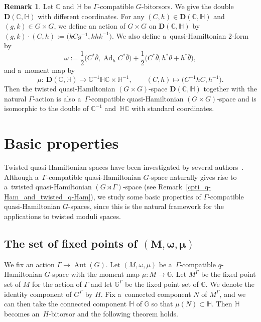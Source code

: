 \documentclass[10pt,a4paper]{amsart}
\numberwithin{equation}{section}
\theoremstyle{definition}
\newtheorem{Remark}[Theorem]{Remark}
\newcommand{\Ad}{\operatorname{Ad}}
\newcommand{\Aut}{\operatorname{Aut}}
\newcommand{\bG}{\mathbb{G}}
\newcommand{\bH}{\mathbb{H}}
\newcommand{\bC}{\mathbb{C}}
\begin{document}
\begin{Remark}\label{the double with different coordinates}
 Let $\bC$ and $\bH$ be $\Gamma$-compatible $G$-bitorsors. We give the double $\textbf{D}(\bC,\bH)$ with different coordinates.
 For any $(C,h) \in \textbf{D}(\bC,\bH)$ and $(g,k) \in G \times G$, we define an action of $G \times G$ on $\textbf{D}(\bC,\bH)$ by $(g,k) \cdot (C,h) := \bigl(kCg^{-1},khk^{-1}\bigr)$.
 We also define a~quasi-Hamiltonian $2$-form by
 \[\omega := \frac{1}{2}\bigl(C^*\overline{\theta},\Ad_{h}C^*\overline{\theta}\bigr)+\frac{1}{2}\bigl(C^*\overline{\theta},h^*\theta+h^*\overline{\theta}\bigr),\]
 and a~moment map by
 \[
 \mu \colon\ \textbf{D}(\bC,\bH) \to \bC^{-1} \bH \bC \times \bH^{-1},\qquad (C,h) \mapsto \bigl(C^{-1}hC, h^{-1}\bigr).
 \]
 Then the twisted quasi-Hamiltonian $(G \times G)$-space $\textbf{D}(\bC,\bH)$ together with the natural $\Gamma$-action is also a~$\Gamma$-compatible quasi-Hamiltonian $(G \times G)$-space and is isomorphic to the double of $\bC^{-1}$ and~$\bH \bC$ with standard coordinates.
\end{Remark}

\section{Basic properties}\label{3Basic_properties}

Twisted quasi-Hamiltonian spaces have been investigated by several authors~\cite{B-Y2015,Knop,Meinrenken2017}.
Although a~$\Gamma$-compatible quasi-Hamiltonian $G$-space naturally gives rise to a~twisted quasi-Hamil\-tonian $(G \rtimes \Gamma)$-space (see Remark~\ref{cpti_q-Ham_and_twisted_q-Ham}), we study some basic properties of $\Gamma$-compatible quasi-Hamiltonian $G$-spaces, since this is the natural framework for the applications to twisted moduli spaces.

\subsection[The set of fixed points of (M, omega, mu)]{The set of fixed points of $\boldsymbol{(M, \omega, \mu)}$}

We fix an action $\Gamma \to \Aut(G)$.
Let $(M,\omega, \mu)$ be a~$\Gamma$-compatible $q$-Hamiltonian $G$-space with the moment map $\mu \colon M \to \bG$.
Let $M^{\Gamma}$ be the fixed point set of $M$ for the action of $\Gamma$ and let $\bG^{\Gamma}$ be the fixed point set of $\bG$.
We denote the identity component of $G^{\Gamma}$ by $H$.
Fix a~connected component $N$ of $M^{\Gamma}$, and we can then take the connected component $\bH$ of $\bG$ so that $\mu(N) \subset \bH$.
Then $\bH$ becomes an~$H$-bitorsor and the following theorem holds.
\end{document}
